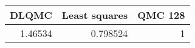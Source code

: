 \begin{tabular}{rrr}
\toprule
   DLQMC &   Least squares &   QMC 128 \\
\midrule
 1.46534 &        0.798524 &         1 \\
\bottomrule
\end{tabular}
